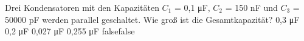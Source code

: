     {Drei Kondensatoren mit den Kapazitäten $C_1$ = 0,1 \si{\micro\farad}, $C_2$ = 150 nF und $C_3$ = 50000 pF werden parallel geschaltet. Wie groß ist die Gesamtkapazität?}
    {0,3 \si{\micro\farad}}
    {0,2 \si{\micro\farad}}
    {0,027 \si{\micro\farad}}
    {0,255 \si{\micro\farad}}
    {false}{false}